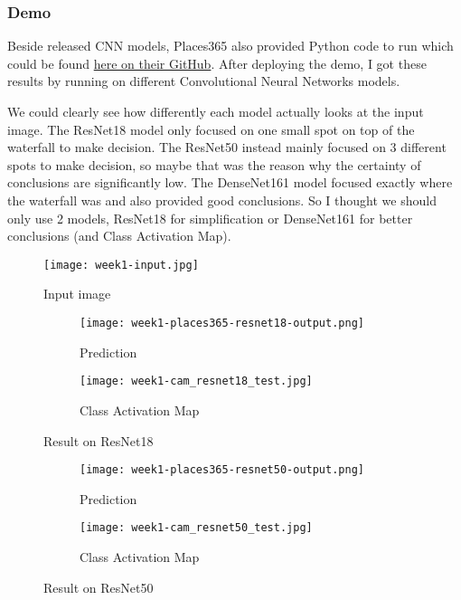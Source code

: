 \subsubsection{Demo}
Beside released CNN models, Places365 also provided Python code to run which could be found \href{https://github.com/CSAILVision/places365}{here on their GitHub}. After deploying the demo, I got these results by running on different Convolutional Neural Networks models.

We could clearly see how differently each model actually looks at the input image. The ResNet18 model only focused on one small spot on top of the waterfall to make decision. The ResNet50 instead mainly focused on 3 different spots to make decision, so maybe that was the reason why the certainty of conclusions are significantly low. The DenseNet161 model focused exactly where the waterfall was and also provided good conclusions. So I thought we should only use 2 models, ResNet18 for simplification or DenseNet161 for better conclusions (and Class Activation Map).


\begin{figure}[!ht]
\centering
\texttt{[image: week1-input.jpg]}
\caption{Input image}
\end{figure}

\newpage
\begin{figure}[!ht]
\centering
\begin{subfigure}{0.7\textwidth}
  \centering
  \texttt{[image: week1-places365-resnet18-output.png]}
  \caption{Prediction}
\end{subfigure}%
\begin{subfigure}{0.3\textwidth}
  \centering
  \texttt{[image: week1-cam\_resnet18\_test.jpg]}
  \caption{Class Activation Map}
\end{subfigure}
\caption{Result on ResNet18}
\end{figure}

\begin{figure}[!ht]
\centering
\begin{subfigure}{0.7\textwidth}
  \centering
  \texttt{[image: week1-places365-resnet50-output.png]}
  \caption{Prediction}
\end{subfigure}%
\begin{subfigure}{0.3\textwidth}
  \centering
  \texttt{[image: week1-cam\_resnet50\_test.jpg]}
  \caption{Class Activation Map}
\end{subfigure}
\caption{Result on ResNet50}
\end{figure}

